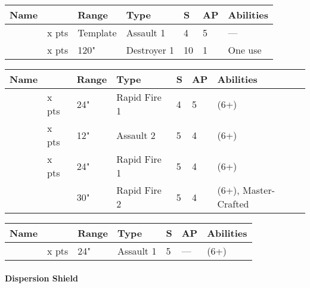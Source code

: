  \label{Ranged Weapons}


\label{Gauntlet of Fire} \label{Tachyon Arrow}
\noindent
\begin{tabular}{||m{110pt} m{30pt} m{31pt} m{55pt} m{12pt} m{12pt} m{210pt}||}
	\hline
	Name & & Range & Type & S & AP & Abilities \\
	\hline
	\quickref{Gauntlet of Fire} & x pts& Template & Assault 1 & 4 & 5 & — \\
	\quickref{Tachyon Arrow} & x pts& 120" & Destroyer 1 & 10 & 1 & One use \\
	\hline
\end{tabular}




\label{Gauss Blaster} \label{Gauss Flayer} \label{Gauss Reaper} \label{Relic Gauss Blaster}
\noindent
\begin{tabular}{||m{110pt} m{30pt} m{31pt} m{55pt} m{12pt} m{12pt} m{210pt}||}
	\hline
	Name & & Range & Type & S & AP & Abilities \\
	\hline
	\quickref{Gauss Flayer} & x pts& 24" & Rapid Fire 1 & 4 & 5 & \quickref{Gauss} (6+) \\
	\quickref{Gauss Reaper} & x pts& 12" & Assault 2 & 5 & 4 & \quickref{Gauss} (6+) \\
	\quickref{Gauss Blaster} & x pts& 24" & Rapid Fire 1 & 5 & 4 & \quickref{Gauss} (6+) \\
	\quickref{Relic Gauss Blaster} & & 30" & Rapid Fire 2 & 5 & 4 & \quickref{Gauss} (6+), Master-Crafted \\	
	\hline
\end{tabular}


\label{Tesla Carbine}
\noindent
\begin{tabular}{||m{110pt} m{30pt} m{31pt} m{55pt} m{12pt} m{12pt} m{210pt}||}
	\hline
	Name & & Range & Type & S & AP & Abilities \\
	\hline
	\quickref{Tesla Carbine} & x pts& 24" & Assault 1 & 5 & — & \quickref{Tesla} (6+) \\	
	\hline
\end{tabular}


 \label{Technoarcana}

\paragraph*{Dispersion Shield} \label{Dispersion Shield}

